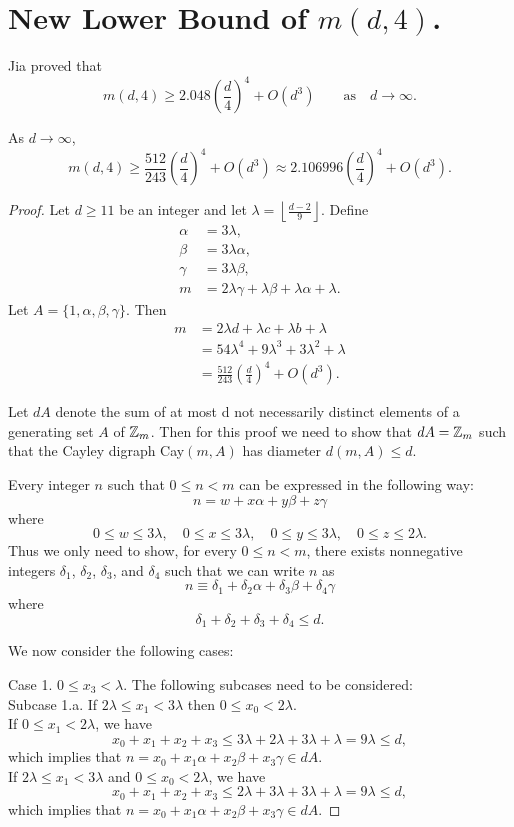 \section{ New Lower Bound of $m(d, 4)$.}

Jia proved that 
\[ 
m(d, 4) \geq2.048 \left(\frac{d}{4}\right)^4  +O(d^3)\qquad\text{as}\quad d\to\infty.
\]

\begin{theorem} As $d\to\infty$, 
\[
m(d,4) \geq \frac{512}{243}\left(\frac d4\right)^4 + O(d^3)\approx 2.106996 \left(\frac d4\right)^4 + O(d^3).
\]
\end{theorem}

\begin{proof}
Let $d \geq 11$ be an integer and let $\lambda = \left \lfloor \frac{d - 2}{9} \right \rfloor$. Define
\begin{align*}
\alpha &= 3 \lambda,\\
\beta &=3 \lambda \alpha,\\
\gamma &= 3 \lambda \beta,\\
m &= 2 \lambda \gamma + \lambda \beta + \lambda \alpha + \lambda.
\end{align*}
Let $A = \{1, \alpha, \beta, \gamma\}$. Then
\begin{align*}
m &= 2 \lambda d + \lambda c + \lambda b + \lambda \\
&= 54\lambda^4 + 9\lambda^3 + 3\lambda^2 + \lambda\\
&= \frac{512}{243}\left(\frac d4\right)^4 + O(d^3).
\end{align*}

Let $dA$ denote the sum of at most d not necessarily distinct elements of a generating set $A$ of $\mbox{$\mathbb Z$}_m$. Then for this proof we need to show that $dA = \mbox{$\mathbb Z$}_m$ such that the Cayley digraph Cay$(m, A)$ has diameter $d(m, A) \leq d$. 

Every integer $n$ such that $0 \leq n < m$ can be expressed in the following way:
\[ n = w + x\alpha + y\beta + z\gamma\]
where 
\[ 0 \leq w \leq 3\lambda, \quad 0 \leq x \leq 3\lambda,\quad 0 \leq y \leq 3\lambda,\quad 0 \leq z \leq 2\lambda.\]
Thus we only need to show, for every $0 \leq n < m$, there exists nonnegative integers $\delta_1$, $\delta_2$, $\delta_3$, and $\delta_4$ such that we can write $n$ as
\[ n \equiv \delta_1 + \delta_2 \alpha + \delta_3 \beta + \delta_4 \gamma\]
where 
\[ \delta_1 + \delta_2 + \delta_3 + \delta_4 \leq d.\]

We now consider the following cases:

Case 1.  $0 \leq x_3 < \lambda$. The following subcases need to be considered:\\
Subcase 1.a. If $2 \lambda \leq x_1 < 3 \lambda$ then $0 \leq x_0 < 2\lambda$. \\
If $0 \leq x_1 < 2 \lambda$, we have 
\[ x_0 + x_1 + x_2 + x_3 \leq 3\lambda + 2\lambda + 3\lambda + \lambda = 9\lambda \leq d, \]
which implies that $n = x_0 + x_1\alpha + x_2\beta + x_3\gamma \in dA$. \\
If $2 \lambda \leq x_1 < 3 \lambda$ and  $0 \leq x_0 < 2\lambda$, we have 
\[ x_0 + x_1 + x_2 + x_3 \leq 2\lambda + 3\lambda + 3\lambda + \lambda = 9\lambda \leq d, \]
which implies that $n = x_0 + x_1\alpha + x_2\beta + x_3\gamma \in dA$. 


\end{proof}
